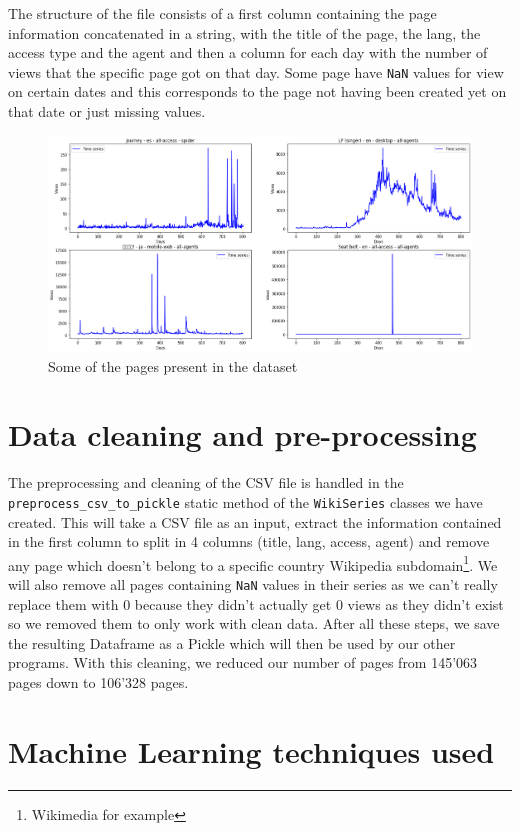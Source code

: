 \documentclass[11pt]{article}
\begin{document}
    The structure of the file consists of a first column containing the page information concatenated in a string, with the title of the page, the lang, the access type and the agent and then a column for each day with the number of views that the specific page got on that day. Some page have \verb+NaN+ values for view on certain dates and this corresponds to the page not having been created yet on that date or just missing values.

    \begin{figure}[H]
        \centering
        \includegraphics[width=\textwidth]{pages.png}
        \caption{Some of the pages present in the dataset}
    \end{figure}
    \section{Data cleaning and pre-processing}
    The preprocessing and cleaning of the CSV file is handled in the \verb+preprocess_csv_to_pickle+ static method of the \verb+WikiSeries+ classes we have created. This will take a CSV file as an input, extract the information contained in the first column to split in 4 columns (title, lang, access, agent) and remove any page which doesn't belong to a specific country Wikipedia subdomain\footnote{Wikimedia for example}. We will also remove all pages containing \verb+NaN+ values in their series as we can't really replace them with 0 because they didn't actually get 0 views as they didn't exist so we removed them to only work with clean data. After all these steps, we save the resulting Dataframe as a Pickle which will then be used by our other programs. With this cleaning, we reduced our number of pages from 145’063 pages down to 106'328 pages.
    \newpage
    \section{Machine Learning techniques used}
\end{document}
